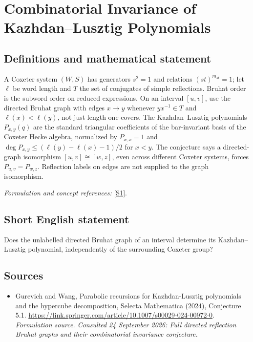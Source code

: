 \documentclass[11pt]{article}
\begin{document}
\section*{\texorpdfstring{Combinatorial Invariance of Kazhdan–Lusztig Polynomials}{Combinatorial Invariance of Kazhdan–Lusztig Polynomials}}\label{30004890}
\subsection{Definitions and mathematical statement}
A Coxeter system $(W,S)$ has generators $s^2=1$ and relations $(st)^{m_{st}}=1$; let $\ell$ be word length and $T$ the set of conjugates of simple reflections. Bruhat order is the subword order on reduced expressions. On an interval $[u,v]$, use the directed Bruhat graph with edges $x\to y$ whenever $yx^{-1}\in T$ and $\ell(x)<\ell(y)$, not just length-one covers. The Kazhdan--Lusztig polynomials $P_{x,y}(q)$ are the standard triangular coefficients of the bar-invariant basis of the Coxeter Hecke algebra, normalized by $P_{x,x}=1$ and $\deg P_{x,y}\le(\ell(y)-\ell(x)-1)/2$ for $x<y$. The conjecture says a directed-graph isomorphism $[u,v]\cong[w,z]$, even across different Coxeter systems, forces $P_{u,v}=P_{w,z}$. Reflection labels on edges are not supplied to the graph isomorphism.
\par\smallskip\textit{Formulation and concept references:} \href{https://link.springer.com/article/10.1007/s00029-024-00972-0}{[S1]}.

\subsection{Short English statement}
Does the unlabelled directed Bruhat graph of an interval determine its Kazhdan--Lusztig polynomial, independently of the surrounding Coxeter group?
\subsection{Sources}
\begin{itemize}
\item[S1]Gurevich and Wang, Parabolic recursions for Kazhdan-Lusztig polynomials and the hypercube decomposition, Selecta Mathematica (2024), Conjecture 5.1.
\url{https://link.springer.com/article/10.1007/s00029-024-00972-0}.
\textit{Formulation source. Consulted 24 September 2026: Full directed reflection Bruhat graphs and their combinatorial invariance conjecture.}
\end{itemize}
\end{document}
